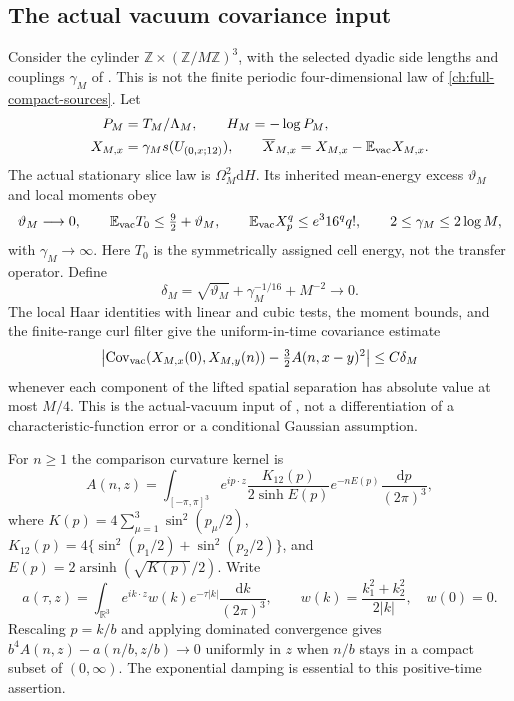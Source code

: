 \documentclass[11pt,oneside,openany]{book}
\theoremstyle{definition}
\theoremstyle{remark}
\newcommand{\dd}{\mathrm d}
\newcommand{\src}[2]{\cite[#2]{#1}}
\begin{document}
\subsection{The actual vacuum covariance input}
Consider the cylinder
$\mathbb Z\times(\mathbb Z/M\mathbb Z)^3$, with the selected
dyadic side lengths and couplings $\gamma_M$ of
\src{F15}{V60--V64}. This is not the finite periodic four-dimensional
law of \cref{ch:full-compact-sources}. Let
\begin{align*}
 P_M&=T_M/\Lambda_M,\qquad H_M=-\log P_M,\\
 X_{M,x}&=\gamma_Ms(U_{(0,x;12)}),\qquad
 \overline X_{M,x}=X_{M,x}-\mathbb E_{\rm vac}X_{M,x}.
\end{align*}
The actual stationary slice law is $\Omega_M^2\dd H$. Its inherited
mean-energy excess $\vartheta_M$ and local moments obey
\begin{equation}
 \vartheta_M\longrightarrow0,\qquad
 \mathbb E_{\rm vac}T_0\le\tfrac92+\vartheta_M,
 \qquad
 \mathbb E_{\rm vac}X_p^q\le e^3 16^q q!,
 \qquad 2\le\gamma_M\le2\log M,
 \label{eq:smeared-vacuum-inputs}
\end{equation}
with $\gamma_M\to\infty$. Here $T_0$ is the symmetrically assigned
cell energy, not the transfer operator. Define
\begin{equation}
 \delta_M=\sqrt{\vartheta_M}+\gamma_M^{-1/16}+M^{-2}
                                                        \longrightarrow0.
 \label{eq:smeared-vacuum-error}
\end{equation}
The local Haar identities with linear and cubic tests, the moment
bounds, and the finite-range curl filter give the uniform-in-time
covariance estimate
\begin{equation}
 \left|\operatorname{Cov}_{\rm vac}(X_{M,x}(0),X_{M,y}(n))
                    -\tfrac32 A(n,x-y)^2\right|\le C\delta_M
 \label{eq:smeared-vacuum-covariance}
\end{equation}
whenever each component of the lifted spatial separation has
absolute value at most $M/4$. This is the actual-vacuum input of
\src{F15}{V64}, not a differentiation of a characteristic-function
error or a conditional Gaussian assumption.

For $n\ge1$ the comparison curvature kernel is
\begin{equation}
 A(n,z)=\int_{[-\pi,\pi]^3}e^{ip\cdot z}
              \frac{K_{12}(p)}{2\sinh E(p)}e^{-nE(p)}
                                  \frac{\dd p}{(2\pi)^3},
 \label{eq:smeared-lattice-curvature-kernel}
\end{equation}
where
$K(p)=4\sum_{\mu=1}^3\sin^2(p_\mu/2)$,
$K_{12}(p)=4\{\sin^2(p_1/2)+\sin^2(p_2/2)\}$, and
$E(p)=2\operatorname{arsinh}(\sqrt{K(p)}/2)$.
Write
\begin{equation}
 a(\tau,z)=\int_{\mathbb R^3}e^{ik\cdot z}
                    w(k)e^{-\tau|k|}\frac{\dd k}{(2\pi)^3},
 \qquad w(k)=\frac{k_1^2+k_2^2}{2|k|},\quad w(0)=0.
 \label{eq:smeared-continuum-curvature-kernel}
\end{equation}
Rescaling $p=k/b$ and applying dominated convergence gives
$b^4A(n,z)-a(n/b,z/b)\to0$ uniformly in $z$ when $n/b$ stays
in a compact subset of $(0,\infty)$. The exponential damping is
essential to this positive-time assertion.
\end{document}
